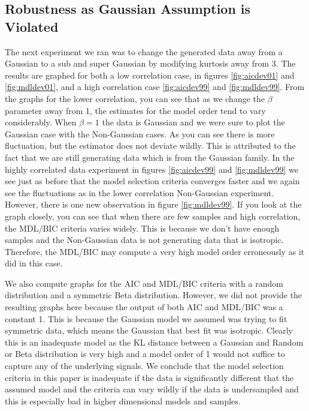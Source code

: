 \documentclass[journal]{IEEEtran}
\begin{document}
\subsection{Robustness as Gaussian Assumption is Violated}
\par The next experiment we ran was to change the generated data away from a Gaussian to a sub and super Gaussian by modifying kurtosis away from 3. The results are graphed for both a low correlation case, in figures \ref{fig:aicdev01} and \ref{fig:mdldev01}, and a high correlation case \ref{fig:aicdev99} and \ref{fig:mdldev99}. From the graphs for the lower correlation, you can see that as we change the \(\beta\) parameter away from 1, the estimates for the model order tend to vary considerably. When \(\beta = 1\) the data is Gaussian and we were sure to plot the Gaussian case with the Non-Gaussian cases. As you can see there is more fluctuation, but the estimator does not deviate wildly. This is attributed to the fact that we are still generating data which is from the Gaussian family. In the highly correlated data experiment in figures \ref{fig:aicdev99} and \ref{fig:mdldev99} we see just as before that the model selection criteria converges faster and we again see the fluctuations as in the lower correlation Non-Gaussian experiment. However, there is one new observation in figure \ref{fig:mdldev99}. If you look at the graph closely, you can see that when there are few samples and high correlation, the MDL/BIC criteria varies widely. This is because we don't have enough samples and the Non-Gaussian data is not generating data that is isotropic. Therefore, the MDL/BIC may compute a very high model order erroneously as it did in this case.
\par We also compute graphs for the AIC and MDL/BIC criteria with a random distribution and a symmetric Beta distribution. However, we did not provide the resulting graphs here because the output of both AIC and MDL/BIC was a constant 1. This is because the Gaussian model we assumed was trying to fit symmetric data, which means the Gaussian that best fit was isotropic. Clearly this is an inadequate model as the KL distance between a Gaussian and Random or Beta distribution is very high and a model order of 1 would not suffice to capture any of the underlying signals. We conclude that the model selection criteria in this paper is inadequate if the data is significantly different that the assumed model and the criteria can vary wildly if the data is undersampled and this is especially bad in higher dimensional models and samples.
\end{document}
